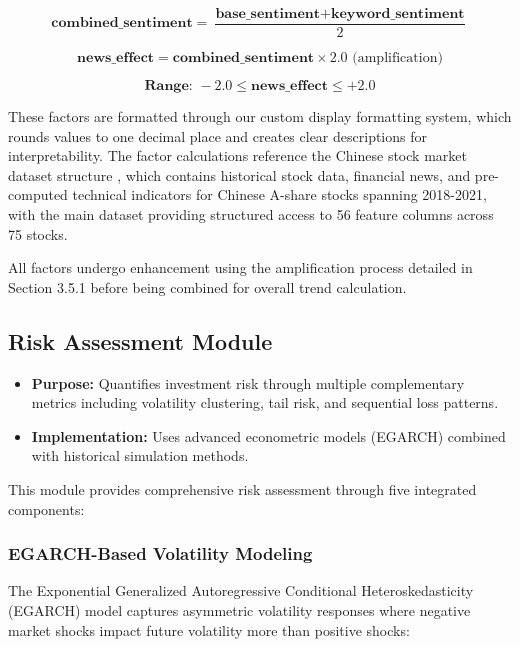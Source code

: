 \documentclass[3p,times,procedia]{elsarticle}
\begin{document}
\begin{equation}
\textbf{combined\_sentiment} = \frac{\textbf{base\_sentiment} + \textbf{keyword\_sentiment}}{2}
\end{equation}

\begin{equation}
\textbf{news\_effect} = \textbf{combined\_sentiment} \times 2.0 \text{ (amplification)}
\end{equation}

\begin{equation}
\textbf{Range: } -2.0 \leq \textbf{news\_effect} \leq +2.0
\end{equation}


These factors are formatted through our custom display formatting system, which rounds values to one decimal place and creates clear descriptions for interpretability. The factor calculations reference the Chinese stock market dataset structure \cite{FinReportDataset2025}, which contains historical stock data, financial news, and pre-computed technical indicators for Chinese A-share stocks spanning 2018-2021, with the main dataset providing structured access to 56 feature columns across 75 stocks.

All factors undergo enhancement using the amplification process detailed in Section 3.5.1 before being combined for overall trend calculation.

\subsection{{Risk Assessment Module}}
\begin{itemize}
    \item \textbf{Purpose:} Quantifies investment risk through multiple complementary metrics including volatility clustering, tail risk, and sequential loss patterns.
    \item \textbf{Implementation:} Uses advanced econometric models (EGARCH) combined with historical simulation methods.
\end{itemize}

This module provides comprehensive risk assessment through five integrated components:

\subsubsection{{EGARCH-Based Volatility Modeling}}
The Exponential Generalized Autoregressive Conditional Heteroskedasticity (EGARCH) model captures asymmetric volatility responses where negative market shocks impact future volatility more than positive shocks:
\end{document}
